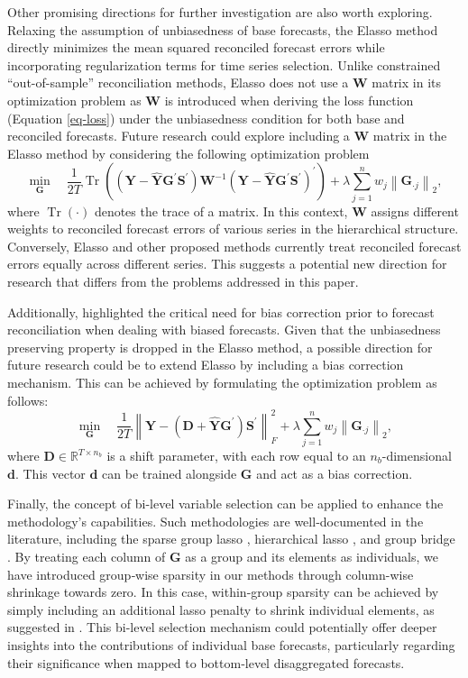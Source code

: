 \documentclass[
  11pt]{article}
\theoremstyle{plain}
\theoremstyle{remark}
\begin{document}
Other promising directions for further investigation are also worth
exploring. Relaxing the assumption of unbiasedness of base forecasts,
the Elasso method directly minimizes the mean squared reconciled
forecast errors while incorporating regularization terms for time series
selection. Unlike constrained ``out-of-sample'' reconciliation methods,
Elasso does not use a \(\bm{W}\) matrix in its optimization problem as
\(\bm{W}\) is introduced when deriving the loss function (Equation
\eqref{eq-loss}) under the unbiasedness condition for both base and
reconciled forecasts. Future research could explore including a
\(\bm{W}\) matrix in the Elasso method by considering the following
optimization problem \[
\min_{\bm{G}} \quad \frac{1}{2 T} \operatorname{Tr}\left( \left(\bm{Y}-\hat{\bm{Y}} \bm{G}^{\prime} \bm{S}^{\prime}\right)\bm{W}^{-1}\left(\bm{Y}-\hat{\bm{Y}} \bm{G}^{\prime} \bm{S}^{\prime}\right)^{\prime}\right) + \lambda \sum_{j=1}^n w_j \left\|\bm{G}_{\cdot j}\right\|_2,
\] where \(\operatorname{Tr}(\cdot)\) denotes the trace of a matrix. In
this context, \(\bm{W}\) assigns different weights to reconciled
forecast errors of various series in the hierarchical structure.
Conversely, Elasso and other proposed methods currently treat reconciled
forecast errors equally across different series. This suggests a
potential new direction for research that differs from the problems
addressed in this paper.

Additionally, \citet{Panagiotelis2021-mf} highlighted the critical need
for bias correction prior to forecast reconciliation when dealing with
biased forecasts. Given that the unbiasedness preserving property is
dropped in the Elasso method, a possible direction for future research
could be to extend Elasso by including a bias correction mechanism. This
can be achieved by formulating the optimization problem as follows: \[
\min_{\bm{G}} \quad \frac{1}{2 T} \left\|\bm{Y}-\left(\bm{D} + \hat{\bm{Y}} \bm{G}^{\prime}\right)\bm{S}^{\prime}\right\|_F^2 + \lambda \sum_{j=1}^n w_j \left\|\bm{G}_{\cdot j}\right\|_2,
\] where \(\bm{D} \in \mathbb{R}^{T \times n_b}\) is a shift parameter,
with each row equal to an \(n_b\)-dimensional \(\bm{d}\). This vector
\(\bm{d}\) can be trained alongside \(\bm{G}\) and act as a bias
correction.

Finally, the concept of bi-level variable selection can be applied to
enhance the methodology's capabilities. Such methodologies are
well‑documented in the literature, including the sparse group lasso
\citep{Simon2013-sp}, hierarchical lasso \citep{Zhou2010-vs}, and group
bridge \citep{Huang2009-vs}. By treating each column of \(\bm{G}\) as a
group and its elements as individuals, we have introduced group‑wise
sparsity in our methods through column-wise shrinkage towards zero. In
this case, within-group sparsity can be achieved by simply including an
additional lasso penalty to shrink individual elements, as suggested in
\citet{Simon2013-sp}. This bi-level selection mechanism could
potentially offer deeper insights into the contributions of individual
base forecasts, particularly regarding their significance when mapped to
bottom‑level disaggregated forecasts.
\end{document}
